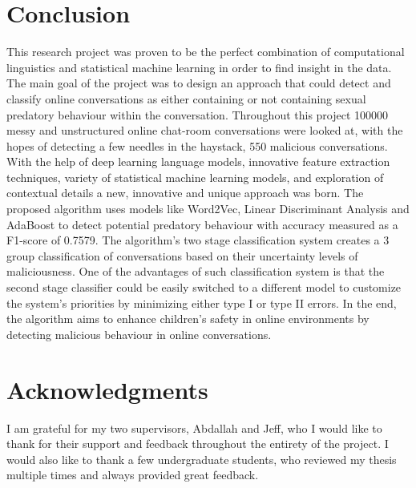 \documentclass[11pt]{article}
\begin{document}
\section{Conclusion}
This research project was proven to be the perfect combination of computational linguistics and statistical machine learning in order to find insight in the data. The main goal of the project was to design an approach that could detect and classify online conversations as either containing or not containing sexual predatory behaviour within the conversation. Throughout this project 100000 messy and unstructured online chat-room conversations were looked at, with the hopes of detecting a few needles in the haystack, 550 malicious conversations. With the help of deep learning language models, innovative feature extraction techniques, variety of statistical machine learning models, and exploration of contextual details a new, innovative and unique approach was born. The proposed algorithm uses models like Word2Vec, Linear Discriminant Analysis and AdaBoost to detect potential predatory behaviour with accuracy measured as a F1-score of 0.7579. The algorithm's two stage classification system creates a 3 group classification of conversations based on their uncertainty levels of maliciousness. One of the advantages of such classification system is that the second stage classifier could be easily switched to a different model to customize the system's priorities by minimizing either type I or type II errors. In the end, the algorithm aims to enhance children's safety in online environments by detecting malicious behaviour in online conversations. 

\section*{Acknowledgments}
I am grateful for my two supervisors, Abdallah and Jeff, who I would like to thank for their support and feedback throughout the entirety of the project. I would also like to thank a few undergraduate students, who reviewed my thesis multiple times and always provided great feedback.


\end{document}
